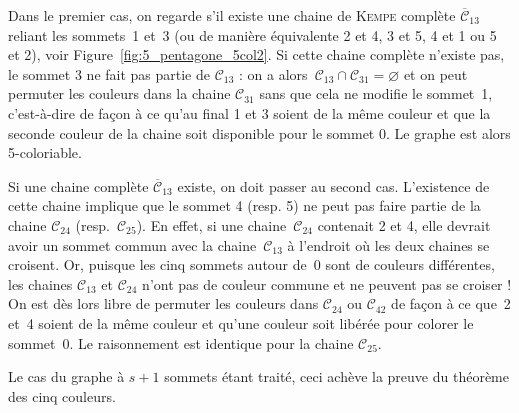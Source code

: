 \begin{SCfigure}[][t!]
	
	\caption{Sommet~0 de degré~5\\\footnotesize\textit{Les sommets 1 à 5 sont de couleurs différentes et forment un chemin fermé autour de 0.}\\\footnotesize{Remarque · \textit{Les arêtes incomplètes partant des sommets 1 à 5 illustrent le fait que le graphe peut contenir d'autres sommets et arêtes, non illustrés sur cette figure. Leur nombre est arbitraire.}}}
	\label{fig:5_pentagone_5col}
\end{SCfigure}

Dans le premier cas, on regarde s'il existe une chaine de \textsc{Kempe} complète $\overline{\mathcal{C}}_{13}$ reliant les sommets~1 et~3 (ou de manière équivalente 2 et 4, 3 et 5, 4 et 1 ou 5 et 2), %
voir Figure~\ref{fig:5_pentagone_5col2}. %
Si cette chaine complète n'existe pas, le sommet 3 ne fait pas partie de $\mathcal{C}_{13}$ : on a alors~$\mathcal{C}_{13}\cap\mathcal{C}_{31}=\varnothing$ et on peut permuter les couleurs dans la chaine $\mathcal{C}_{31}$ sans que cela ne modifie le sommet~1, c'est-à-dire de façon à ce qu'au final 1 et 3 soient de la même couleur et que la seconde couleur de la chaine soit disponible pour le sommet 0. Le graphe est alors 5-coloriable.

Si une chaine complète $\overline{\mathcal{C}}_{13}$ existe, on doit passer au second cas. L'existence de cette chaine implique que le sommet 4 (resp. 5) ne peut pas faire partie de la chaine $\mathcal{C}_{24}$ (resp.~$\mathcal{C}_{25}$). En effet, si une chaine~$\mathcal{C}_{24}$ contenait 2 et 4, elle devrait avoir un sommet commun avec la chaine~$\mathcal{C}_{13}$ à l'endroit où les deux chaines se croisent. Or, puisque les cinq sommets autour de~0 sont de couleurs différentes, les chaines $\mathcal{C}_{13}$ et $\mathcal{C}_{24}$ n'ont pas de couleur commune et ne peuvent pas se croiser ! On est dès lors libre de permuter les couleurs dans $\mathcal{C}_{24}$ ou $\mathcal{C}_{42}$ de façon à ce que~2 et~4 soient de la même couleur et qu'une couleur soit libérée pour colorer le sommet~0. Le raisonnement est identique pour la chaine $\mathcal{C}_{25}$.

Le cas du graphe à $s+1$ sommets étant traité, ceci achève la preuve du théorème des cinq couleurs.

\begin{SCfigure}[][h!]
	
	\caption{Existence d'une chaine~$\overline{\mathcal{C}}_{13}$\\\footnotesize\textit{Si~$\overline{\mathcal{C}}_{13}$ existe, on permute les couleurs dans $\mathcal{C}_{24}$ (ou $\mathcal{C}_{42}$). Si elle n'existe pas, on permute les couleurs dans $\mathcal{C}_{13}$ (ou $\mathcal{C}_{31}$).}\\\footnotesize{Remarque · \textit{Le test peut être fait sur n'importe laquelle des paires de sommets 1-3, 2-4, 4-1 ou 5-2. }}}
	\label{fig:5_pentagone_5col2}
\end{SCfigure}
